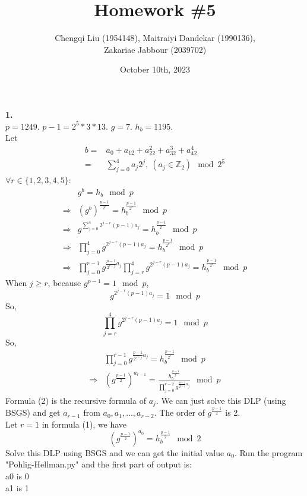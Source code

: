 \documentclass[
12pt, %
]{fphw}
\title{Homework \#5} %
\author{Chengqi Liu (1954148), Maitraiyi Dandekar (1990136),\\ Zakariae Jabbour (2039702)} %
\date{October 10th, 2023} %
\institute{Eindhoven University of Technology} %
\begin{document}
\maketitle %

\textbf{1.\\}
$p=1249$. $p-1=2^5*3*13$. $g=7$. $h_b=1195$.\\
Let
\begin{align*}
	b=&a_0+a_12+a_22^2+a_32^3+a_42^4\\
	=&\sum_{j=0}^{4}a_j2^j,\  (a_j\in\mathbb{Z}_2) \mod 2^5
\end{align*}
$\forall r\in\{1,2,3,4,5\}$:
\begin{align*}
	&g^b=h_b\mod p\\
	\Rightarrow&(g^b)^{\frac{p-1}{2^r}}=h_b^{\frac{p-1}{2^r}}\mod p\\
	\Rightarrow&g^{\sum_{j=0}^{4}2^{j-r}(p-1)a_j}=h_b^{\frac{p-1}{2^r}}\mod p\\
	\Rightarrow&\prod_{j=0}^{4}g^{2^{j-r}(p-1)a_j}=h_b^{\frac{p-1}{2^r}}\mod p\\
	\Rightarrow&\prod_{j=0}^{r-1}g^{\frac{p-1}{2^{r-j}}a_j}\prod_{j=r}^{4}g^{2^{j-r}(p-1)a_j}=h_b^{\frac{p-1}{2^r}}\mod p
\end{align*}
When $j\geq r$, because $g^{p-1}=1\mod p$, 
\[g^{2^{j-r}(p-1)a_j}=1\mod p\]
So,
\[\prod_{j=r}^{4}g^{2^{j-r}(p-1)a_j}=1 \mod p\]
So,
\begin{align}
	&\prod_{j=0}^{r-1}g^{\frac{p-1}{2^{r-j}}a_j}=h_b^{\frac{p-1}{2^r}}\mod p\\
	\Rightarrow&(g^{\frac{p-1}{2}})^{a_{r-1}}=\frac{h_b^{\frac{n-1}{2^r}}}{\prod_{j=0}^{r-2}g^{\frac{p-1}{2^{r-j}}a_j}} \mod p
\end{align}
Formula (2) is the recursive formula of $a_j$. We can just solve this DLP (using BSGS) and get $a_{r-1}$ from $a_0, a_1,...,a_{r-2}$. The order of $g^{\frac{p-1}{2}}$ is 2.\\
Let $r=1$ in formula (1), we have
\[(g^\frac{p-1}{2})^{a_0}=h_b^\frac{p-1}{2}  \mod 2\]
Solve this DLP using BSGS and we can get the initial value $a_0$.
Run the program "Pohlig-Hellman.py" and the first part of output is:\\
a0 is 0\\
a1 is 1\\
\end{document}
